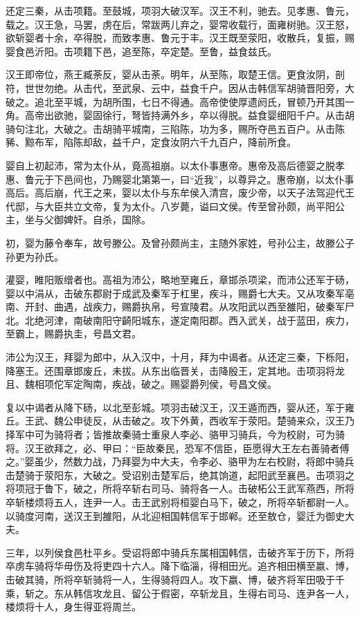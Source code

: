 \documentclass[]{article}
\begin{document}
还定三秦，从击项籍。至鼓城，项羽大破汉军。汉王不利，驰去。见孝惠、鲁元，载之。汉王急，马罢，虏在后，常跋两儿弃之，婴常收载行，面雍树驰。汉王怒，欲斩婴者十余，卒得脱，而致孝惠、鲁元于丰。汉王既至荥阳，收散兵，复振，赐婴食邑沂阳。击项籍下邑，追至陈，卒定楚。至鲁，益食兹氏。

汉王即帝位，燕王臧荼反，婴从击荼。明年，从至陈，取楚王信。更食汝阴，剖符，世世勿绝。从击代，至武泉、云中，益食千户。因从击韩信军胡骑晋阳旁，大破之。追北至平城，为胡所围，七日不得通。高帝使使厚遗阏氏，冒顿乃开其围一角。高帝出欲驰，婴固徐行，弩皆持满外乡，卒以得脱。益食婴细阳千户。从击胡骑句注北，大破之。击胡骑平城南，三陷陈，功为多，赐所夺邑五百户。从击陈豨、黥布军，陷陈却敌，益千户，定食汝阴六千九百户，降前所食。

婴自上初起沛，常为太仆从，竟高祖崩。以太仆事惠帝。惠帝及高后德婴之脱孝惠、鲁元于下邑间也，乃赐婴北第第一，曰``近我''，以尊异之。惠帝崩，以太仆事高后。高后崩，代王之来，婴以太仆与东牟侯入清宫，废少帝，以天子法驾迎代王代邸，与大臣共立文帝，复为太仆。八岁薨，谥曰文侯。传至曾孙颇，尚平阳公主，坐与父御婢奸。自杀，国除。

初，婴为藤令奉车，故号滕公。及曾孙颇尚主，主随外家姓，号孙公主，故滕公子孙更为孙氏。

灌婴，睢阳贩缯者也。高祖为沛公，略地至雍丘，章邯杀项梁，而沛公还军于砀，婴以中涓从，击破东郡尉于成武及秦军于杠里，疾斗，赐爵七大夫。又从攻秦军亳南、开封、曲遇，战疾力，赐爵执帛，号宣陵君。从攻阳武以西至雒阳，破秦军尸北。北绝河津，南破南阳守齮阳城东，遂定南阳郡。西入武关，战于蓝田，疾力，至霸上，赐爵执圭，号昌文君。

沛公为汉王，拜婴为郎中，从入汉中，十月，拜为中谒者。从还定三秦，下栎阳，降塞王。还围章邯废丘，未拔。从东出临晋关，击降殷王，定其地。击项羽将龙且、魏相项佗军定陶南，疾战，破之。赐婴爵列侯，号昌文侯。

复以中谒者从降下砀，以北至彭城。项羽击破汉王，汉王遁而西，婴从还，军于雍丘。王武、魏公申徒反，从击破之。攻下外黄，西收军于荥阳。楚骑来众，汉王乃择军中可为骑将者；皆推故秦骑士重泉人李必、骆甲习骑兵，今为校尉，可为骑将。汉王欲拜之，必、甲曰：``臣故秦民，恐军不信臣，臣愿得大王左右善骑者傅之。''婴虽少，然数力战，乃拜婴为中大夫，令李必、骆甲为左右校尉，将郎中骑兵击楚骑于荥阳东，大破之。受诏别击楚军后，绝其饷道，起阳武至襄邑。击项羽之将项冠于鲁下，破之，所将卒斩右司马、骑将各一人。击破柘公王武军燕西，所将卒斩楼烦将五人，连尹一人。击王武别将桓婴白马下，破之，所将卒斩都尉一人。以骑度河南，送汉王到雒阳，从北迎相国韩信军于邯郸。还至敖仓，婴迁为御史大夫。

三年，以列侯食邑杜平乡。受诏将郎中骑兵东属相国韩信，击破齐军于历下，所将卒虏车骑将华毋伤及将吏四十六人。降下临淄，得相田光。追齐相田横至嬴、博，击破其骑，所将卒斩骑将一人，生得骑将四人。攻下嬴、博，破齐将军田吸于千乘，斩之。东从韩信攻龙且、留公于假密，卒斩龙且，生得右司马、连尹各一人，楼烦将十人，身生得亚将周兰。
\end{document}

